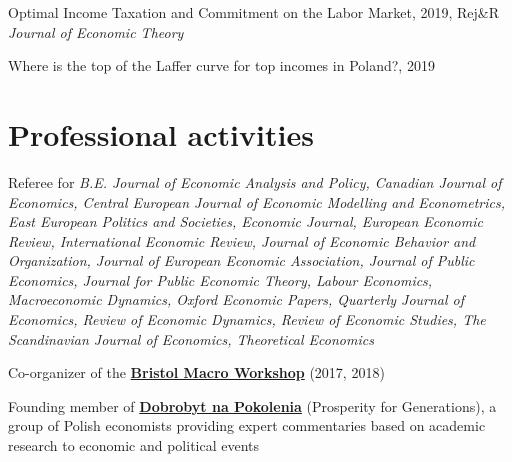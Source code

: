 \documentclass[letterpaper]{article}
\renewenvironment{itemize}{
  \begin{list}{}{
    \setlength{\leftmargin}{1.5em}
  }
}{
  \end{list}
}
\begin{document}

\begin{itemize}
\item Optimal Income Taxation and Commitment on the Labor Market, 2019, Rej\&R \textit{Journal of Economic Theory}
\item Where is the top of the Laffer curve for top incomes in Poland?, 2019
\end{itemize}



\section*{Professional activities}
\begin{itemize}
\item Referee for \textit{B.E. Journal of Economic Analysis and Policy, Canadian Journal of Economics, Central European Journal of Economic Modelling and Econometrics, East European Politics and Societies, Economic Journal, European Economic Review, International Economic Review, Journal of Economic Behavior and Organization, Journal of European Economic Association, Journal of Public Economics, Journal for Public Economic Theory, Labour Economics, Macroeconomic Dynamics, Oxford Economic Papers, Quarterly Journal of Economics, Review of Economic Dynamics, Review of Economic Studies, The Scandinavian Journal of Economics, Theoretical Economics}

\item Co-organizer of the \href{http://pdoligalski.github.io/BristolMacro/index.html}{\textbf{Bristol Macro Workshop}} (2017, 2018)
\item Founding member of \href{https://napokolenia.pl}{\textbf{Dobrobyt na Pokolenia}} (Prosperity for Generations), a group of Polish economists providing expert commentaries based on academic research
 to economic and political events 
\end{itemize}
\end{document}
